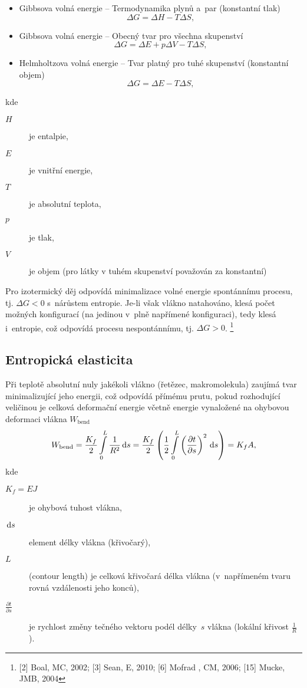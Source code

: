 \begin{itemize}
	\item Gibbsova volná energie -- Termodynamika plynů a~par (konstantní tlak)
	\begin{equation}
	\Delta G = \Delta H - T \Delta S,
	\end{equation}
	\item Gibbsova volná energie -- Obecný tvar pro všechna skupenství
	\begin{equation}
	\Delta G = \Delta E + p \Delta V - T \Delta S,
	\end{equation}
	\item Helmholtzova volná energie -- Tvar platný pro tuhé skupenství (konstantní objem)
	\begin{equation}
	\Delta G = \Delta E - T \Delta S,
	\end{equation}
\end{itemize}
kde
\begin{description}
	\item[$H$] je entalpie,
	\item[$E$] je vnitřní  energie,
	\item[$T$] je absolutní teplota,
	\item[$p$] je tlak,
	\item[$V$] je objem (pro látky v tuhém skupenství považován za konstantní)
\end{description}

Pro izotermický děj odpovídá minimalizace volné energie spontánnímu procesu, tj. $\Delta G < 0$ s~nárůstem entropie.
Je-li však vlákno natahováno, klesá počet možných konfigurací (na jedinou v~plně napřímené konfiguraci), tedy klesá i~entropie, což odpovídá procesu nespontánnímu, tj. $\Delta G > 0$.
\footnote{[2] Boal, MC, 2002; [3] Sean, E, 2010; [6] Mofrad , CM, 2006; [15] Mucke, JMB, 2004}

\subsection{Entropická elasticita}
Při teplotě absolutní nuly jakékoli vlákno (řetězec, makromolekula) zaujímá tvar minimalizující jeho energii, což odpovídá přímému prutu, pokud rozhodující veličinou je celková deformační energie včetně energie vynaložené na ohybovou deformaci vlákna $W_\text{bend}$
\begin{equation}
	W_\text{bend}
	= \frac{K_f}{2} \int\limits_0^L \frac{1}{R^2} \,\mathrm{d} s
	= \frac{K_f}{2} \left( \frac{1}{2} \int\limits_0^L \left(\frac{\partial t}{\partial s}\right)^2 \,\mathrm{d} s \right)
	= K_f A,
\end{equation}
kde
\begin{description}
	\item[$K_f = EJ$] je ohybová tuhost vlákna,
	\item[$\,\mathrm{d} s$] element délky vlákna (křivočarý),
	\item[$L$] (contour length) je celková křivočará délka vlákna (v~napřímeném tvaru rovná vzdálenosti jeho konců),
	\item[$\tfrac{\partial t}{\partial s}$] je rychlost změny tečného vektoru podél délky~$s$ vlákna (lokální křivost $\frac{1}{R}$).
\end{description}

